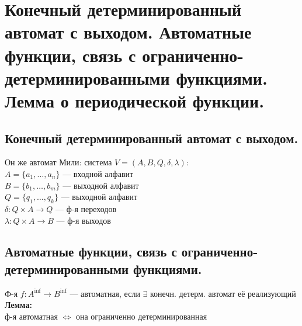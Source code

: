 \documentclass[12pt]{article}
\begin{document}
\section{Конечный детерминированный автомат с выходом. Автоматные функции, связь с ограниченно-детерминированными функциями. Лемма о периодической функции.}
\subsection{Конечный детерминированный автомат с выходом.}
	Он же автомат Мили: система $V = (A, B, Q, \delta, \lambda)$:\\
	$A = \{a_1, \dotsc, a_n\}$ — входной алфавит\\
	$B = \{b_1, \dotsc, b_m\}$ — выходной алфавит\\
	$Q = \{q_1, \dotsc, q_k\}$ — выходной алфавит\\
	$\delta: Q \times A \to Q$ — ф-я переходов\\
	$\lambda: Q \times A \to B$ — ф-я выходов\\
\subsection{Автоматные функции, связь с ограниченно-детерминированными функциями.}
	Ф-я $f: A^{\inf} \to B^{\inf}$ — автоматная, если $\exists$ конечн. детерм. автомат её реализующий\\
	\textbf{Лемма:}\\
		ф-я автоматная $\Leftrightarrow$ она ограниченно детерминированная\\
\end{document}
